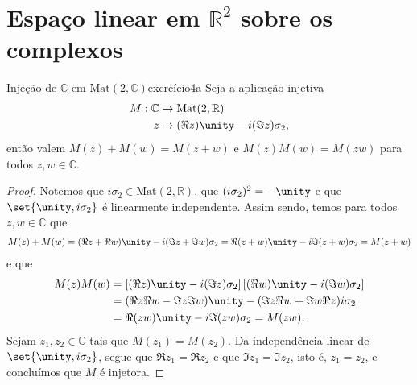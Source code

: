 \section[Espaço linear em R² sobre os complexos]{Espaço linear em \(\mathbb{R}^2\) sobre os complexos}
\begin{proposition}{Injeção de \(\mathbb{C}\) em \(\mathrm{Mat}(2, \mathbb{C})\)}{exercício4a}
    Seja a aplicação injetiva
    \begin{align*}
        M : \mathbb{C} &\to \mathrm{Mat}(2, \mathbb{R})\\
                     z &\mapsto(\Re{z})\unity - i(\Im{z})\sigma_2,
    \end{align*}
    então valem \(M(z) + M(w) = M(z + w)\) e \(M(z) M(w) = M(zw)\) para todos \(z, w \in \mathbb{C}\).
\end{proposition}
\begin{proof}
    Notemos que \(i\sigma_2 \in \mathrm{Mat}(2, \mathbb{R})\), que \((i \sigma_2)^2 = -\unity\) e que \(\set{\unity, i \sigma_2}\) é linearmente independente. Assim sendo, temos para todos \(z, w \in \mathbb{C}\) que
    \begin{align*}
        M(z) + M(w) = (\Re{z} + \Re{w})\unity - i(\Im{z} + \Im{w})\sigma_2
                    = \Re(z+w)\unity - i\Im(z + w) \sigma_2
                    = M(z+w)
    \end{align*}
    e que
    \begin{align*}
        M(z)M(w) &= \left[(\Re{z})\unity - i(\Im{z})\sigma_2 \right]\left[(\Re{w})\unity - i(\Im{w})\sigma_2\right]\\
                 &= (\Re{z} \Re{w} - \Im{z} \Im{w}) \unity - (\Im{z}\Re{w} + \Im{w}\Re{z})i \sigma_2\\
                 &= \Re(zw)\unity - i\Im(zw) \sigma_2 = M(zw).
    \end{align*}
    Sejam \(z_1, z_2 \in \mathbb{C}\) tais que \(M(z_1) = M(z_2)\). Da independência linear de \(\set{\unity, i \sigma_2}\), segue que \(\Re{z_1} = \Re{z_2}\) e que \(\Im{z_1} = \Im{z_2}\), isto é, \(z_1 = z_2\), e concluímos que \(M\) é injetora.
\end{proof}

